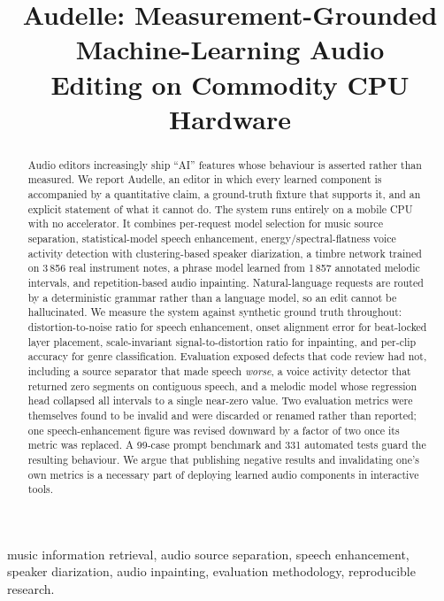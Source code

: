 \documentclass[conference]{IEEEtran}
\begin{document}
\title{Audelle: Measurement-Grounded Machine-Learning Audio\\ Editing on Commodity CPU Hardware}
\author{}
\maketitle

\begin{abstract}
Audio editors increasingly ship ``AI'' features whose behaviour is asserted
rather than measured. We report Audelle, an editor in which every learned
component is accompanied by a quantitative claim, a ground-truth fixture that
supports it, and an explicit statement of what it cannot do. The system runs
entirely on a mobile CPU with no accelerator. It combines per-request model
selection for music source separation, statistical-model speech enhancement,
energy/spectral-flatness voice activity detection with clustering-based speaker
diarization, a timbre network trained on 3\,856 real instrument notes, a
phrase model learned from 1\,857 annotated melodic intervals, and
repetition-based audio inpainting. Natural-language requests are routed by a
deterministic grammar rather than a language model, so an edit cannot be
hallucinated. We measure the system against synthetic ground truth throughout:
distortion-to-noise ratio for speech enhancement, onset alignment error for
beat-locked layer placement, scale-invariant signal-to-distortion ratio for
inpainting, and per-clip accuracy for genre classification. Evaluation exposed
defects that code review had not, including a source separator that made speech
\emph{worse}, a voice activity detector that returned zero segments on
contiguous speech, and a melodic model whose regression head collapsed all
intervals to a single near-zero value. Two evaluation metrics were themselves
found to be invalid and were discarded or renamed rather than reported; one
speech-enhancement figure was revised downward by a factor of two once its
metric was replaced. A 99-case prompt benchmark and 331 automated tests guard
the resulting behaviour. We argue that
publishing negative results and invalidating one's own metrics is a necessary
part of deploying learned audio components in interactive tools.
\end{abstract}

\begin{IEEEkeywords}
music information retrieval, audio source separation, speech enhancement,
speaker diarization, audio inpainting, evaluation methodology, reproducible
research.
\end{IEEEkeywords}
\end{document}
